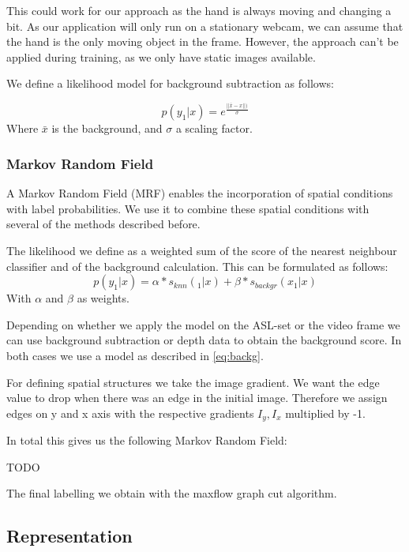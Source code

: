\documentclass[letterpaper, 10 pt, conference]{ieeeconf}  %
\begin{document}
This could work for our approach as the hand is always moving and changing a bit. As our application will only run on a stationary webcam, we can assume that the hand is the only moving object in the frame. However, the approach can't be applied during training, as we only have static images available.

We define a likelihood model for background subtraction as follows:

\begin{equation}
p(y_1 | x) = e^{\frac{||\bar{x}-x||)}{\sigma}}
\label{eq:backg}
\end{equation}
Where $\bar{x}$ is the background, and $\sigma$ a scaling factor.

\subsubsection{Markov Random Field}

A Markov Random Field (MRF) enables the incorporation of spatial conditions with label probabilities. We use it to combine these spatial conditions with several of the methods described before.

The likelihood we define as a weighted sum of the score of the nearest neighbour classifier and of the background calculation. This can be formulated as follows:
\begin{equation}
p(y_1 | x) = \alpha * s_{knn}(_1 | x) + \beta * s_{backgr}(x_1 | x)
\end{equation}
With $\alpha$ and $\beta$ as weights.

Depending on whether we apply the model on the ASL-set or the video frame we can use background subtraction or depth data to obtain the background score. In both cases we use a model as described in \autoref{eq:backg}.

For defining spatial structures we take the image gradient. We want the edge value to drop when there was an edge in the initial image. Therefore we assign edges on y and x axis with the respective gradients $I_y, I_x$ multiplied by -1.

In total this gives us the following Markov Random Field:

TODO

The final labelling we obtain with the maxflow graph cut algorithm.


\subsection{Representation}
\end{document}
